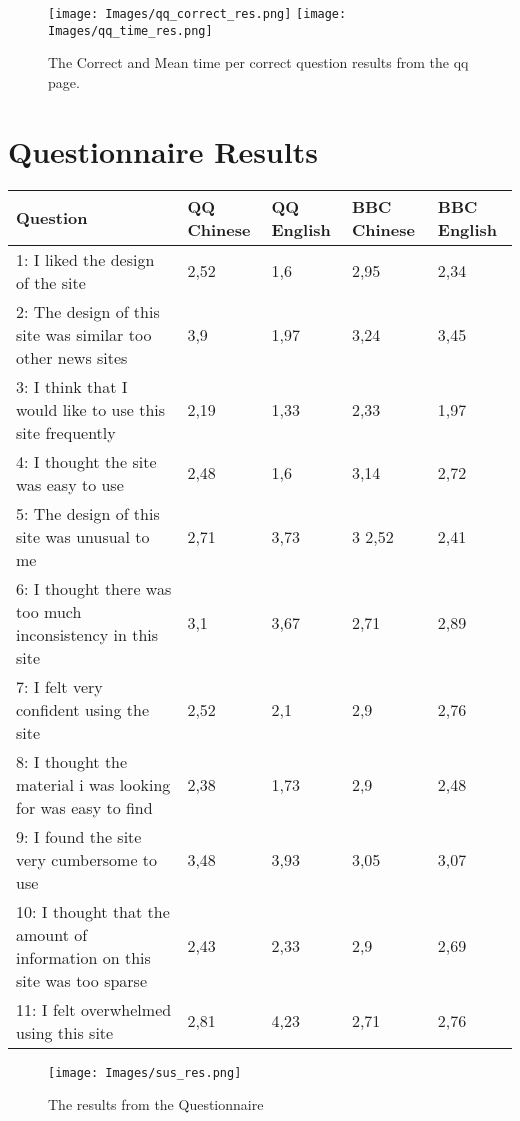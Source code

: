 \begin{figure}[h]
	\centering
	\texttt{[image: Images/qq\_correct\_res.png]}
	\texttt{[image: Images/qq\_time\_res.png]}
	\decoRule
	\caption[QQ Results]{The Correct and Mean time per correct question results from the qq page.}
	\label{fig:qq_results}
\end{figure}

\section{Questionnaire Results} 
\label{sec:sus_res}

\begin{center}
	\begin{tabular}{ | p{5cm} | l | l |  l | l |}
		\hline
		Question & QQ Chinese & QQ English & BBC Chinese & BBC English \\ \hline
		1: I liked the design of the site &
		2,52 &
		1,6 &
		2,95 & 
		2,34  \\ \hline
		2: The design of this site was similar too other news sites &
		3,9 &
		1,97 &
		3,24 &
		3,45  \\ \hline
		3: I think that I would like to use this site frequently &
		2,19 &
		1,33 &
		2,33 &
		1,97  \\ \hline
		4: I thought the site was easy to use &
		2,48 &
		1,6 &
		3,14 &
		2,72  \\ \hline
		5: The design of this site was unusual to me &
		2,71 &
		3,73 &3
		2,52 &
		2,41  \\ \hline
		6: I thought there was too much inconsistency in this site &
		3,1 &
		3,67 &
		2,71 &
		2,89  \\ \hline
		7: I felt very confident using the site &
		2,52 &
		2,1 &
		2,9 &
		2,76 \\ \hline
		8: I thought the material i was looking for was easy to find &
		2,38 &
		1,73 &
		2,9 &
		2,48 \\ \hline
		9: I found the site very cumbersome to use &
		3,48 &
		3,93 &
		3,05 &
		3,07 \\ \hline
		10: I thought that the amount of information on this site was too sparse &
		2,43 &
		2,33 &
		2,9 &
		2,69 \\ \hline
		11: I felt overwhelmed using this site &
		2,81 &
		4,23 &
		2,71 &
		2,76 \\ \hline
		
	\end{tabular}
\end{center}

\begin{figure}[h]
	\centering
	\texttt{[image: Images/sus\_res.png]}
	\decoRule
	\caption[Questionnaire Results]{The results from the Questionnaire}
	\label{fig:sus_results}
\end{figure}



